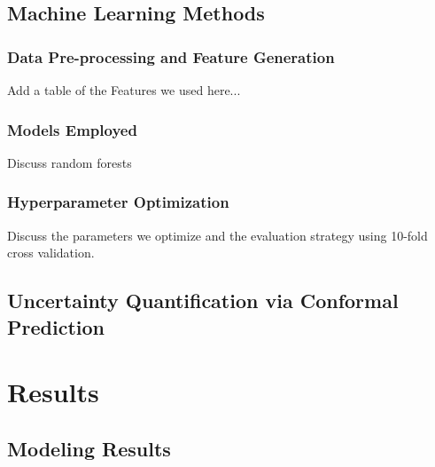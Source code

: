 \documentclass[journal,article,submit,pdftex,moreauthors]{Definitions/mdpi}
\begin{document}
\subsection{Machine Learning Methods}

\subsubsection{Data Pre-processing and Feature Generation}
Add a table of the Features we used here...



\subsubsection{Models Employed}
Discuss random forests
\subsubsection{Hyperparameter Optimization}
Discuss the parameters we optimize and the evaluation strategy using 10-fold cross validation.

\subsection{Uncertainty Quantification via Conformal Prediction}


\section{Results}

\subsection{Modeling Results}
\end{document}
